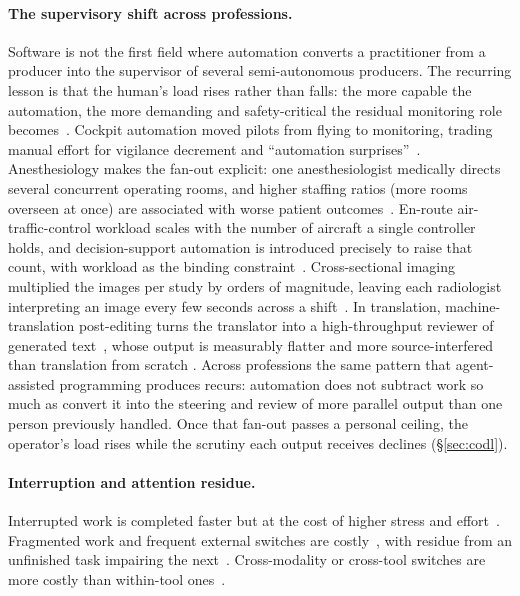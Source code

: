 \documentclass[10pt,twocolumn]{article}
\begin{document}
\paragraph{The supervisory shift across professions.} Software is not the first
field where automation converts a practitioner from a producer into the
supervisor of several semi-autonomous producers. The recurring lesson is
that the human's load rises rather than falls: the more capable the automation,
the more demanding and safety-critical the residual monitoring role
becomes~\cite{bainbridge1983}. Cockpit automation moved pilots from flying to
monitoring, trading manual effort for vigilance decrement and ``automation
surprises''~\cite{wiener1980}. Anesthesiology makes the fan-out explicit: one
anesthesiologist medically directs several concurrent operating rooms, and
higher staffing ratios (more rooms overseen at once) are associated with worse
patient outcomes~\cite{burns2022}. En-route air-traffic-control workload scales
with the number of aircraft a single controller holds, and decision-support
automation is introduced precisely to raise that count, with workload as the
binding constraint~\cite{loft2007}. Cross-sectional imaging multiplied the
images per study by orders of magnitude, leaving each radiologist interpreting
an image every few seconds across a shift~\cite{mcdonald2015}. In translation,
machine-translation post-editing turns the translator into a high-throughput
reviewer of generated text~\cite{krings2001}, whose output is measurably flatter
and more source-interfered than translation from scratch
\cite{toral2019}. Across professions the same pattern that agent-assisted
programming produces recurs: automation does not subtract work so much as
convert it into the steering and review of more parallel output than one person
previously handled. Once that fan-out passes a personal ceiling, the operator's
load rises while the scrutiny each output receives declines
(\S\ref{sec:codl}).

\paragraph{Interruption and attention residue.} Interrupted work is completed
faster but at the cost of higher stress and effort~\cite{mark2008}. Fragmented
work and frequent external switches are costly~\cite{mark2005}, with residue
from an unfinished task impairing the next~\cite{leroy2009}. Cross-modality
or cross-tool switches are more costly than within-tool ones~\cite{wickens2008}.
\end{document}
